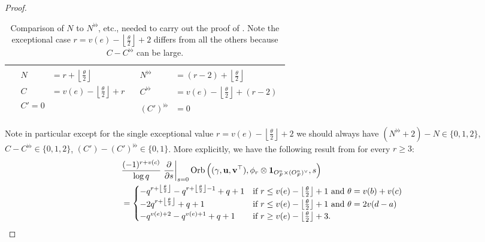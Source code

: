 \begin{proof}
\begin{table}
\begin{tabular}{lll}
        & $\begin{aligned} N &= r + \left\lfloor \tfrac{\theta}{2} \right\rfloor \\
          C &= v(e) - \left\lfloor \tfrac{\theta}{2} \right\rfloor + r \\
          C' = 0 \end{aligned}$
        & $\begin{aligned} N^{\flat\flat} &= (r-2) + \left\lfloor \tfrac{\theta}{2} \right\rfloor \\
          C^{\flat\flat} &= v(e) - \left\lfloor \tfrac{\theta}{2} \right\rfloor + (r-2) \\
          (C')^{\flat\flat} &= 0 \end{aligned}$ \\
      \bottomrule
    \end{tabular}
    \caption{Comparison of $N$ to $N^{\flat\flat}$, etc.,
      needed to carry out the proof of .
      Note the exceptional case $r = v(e) - \left\lfloor \frac{\theta}{2} \right\rfloor + 2$
      differs from all the others because $C-C^{\flat\flat}$ can be large.}
    \label{tab:semi_lie_change_by_two}
  \end{table}
  Note in particular except for the single exceptional value
  $r = v(e) - \left\lfloor \frac{\theta}{2} \right\rfloor + 2$
  we should always have $(N^{\flat\flat}+2)-N \in \{0,1,2\}$,
  $C - C^{\flat\flat} \in \{0,1,2\}$, $(C') - (C')^{\flat\flat} \in \{0,1\}$.
  More explicitly, we have the following result from 
  for every $r \ge 3$:
  \begin{align*}
    &\frac{(-1)^{r+v(c)}}{\log q}
    \left. \pdv{}{s} \right\rvert_{s=0}
    \operatorname{Orb} \left( {(\gamma, \mathbf u, \mathbf v^\top)}, \phi_r \otimes \mathbf{1}_{O_F^n \times (O_F^n)^\vee}, s \right) \\
    &=
    \begin{cases}
      -q^{r+\left\lfloor \frac{\theta}{2} \right\rfloor} -q^{r+\left\lfloor \frac{\theta}{2} \right\rfloor - 1} + q + 1
        & \text{if } r \le v(e) - \left\lfloor \frac{\theta}{2} \right\rfloor + 1 \text{ and } \theta = v(b)+v(c) \\
      -2q^{r+\left\lfloor \frac{\theta}{2} \right\rfloor} + q + 1 & \text{if } r \le v(e) - \left\lfloor \frac{\theta}{2} \right\rfloor + 1 \text{ and } \theta = 2v(d-a) \\
      -q^{v(e)+2} - q^{v(e)+1} + q + 1  & \text{if } r \ge v(e) - \left\lfloor \frac{\theta}{2} \right\rfloor + 3.
    \end{cases}
  \end{align*}

\end{proof}
